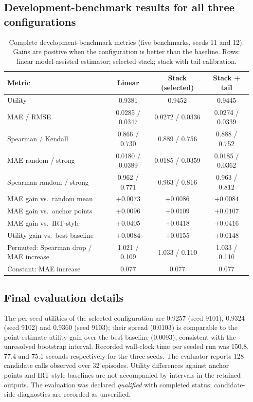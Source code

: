\documentclass{article}
\begin{document}
\subsection{Development-benchmark results for all three configurations}
\begin{table}[h]
\centering
\caption{Complete development-benchmark metrics (five benchmarks, seeds 11 and 12). Gains are positive when the configuration is better than the baseline. Rows: linear model-assisted estimator; selected stack; stack with tail calibration.}
\label{tab:search-full}
\footnotesize
\setlength{\tabcolsep}{3pt}
\begin{tabular}{lccc}
\toprule
Metric & Linear & Stack (selected) & Stack + tail \\
\midrule
Utility & 0.9381 & 0.9452 & 0.9445 \\ %
MAE / RMSE & 0.0285 / 0.0347 & 0.0272 / 0.0336 & 0.0274 / 0.0339 \\
Spearman / Kendall & 0.866 / 0.730 & 0.889 / 0.756 & 0.888 / 0.752 \\
MAE random / strong & 0.0180 / 0.0389 & 0.0185 / 0.0359 & 0.0185 / 0.0362 \\
Spearman random / strong & 0.962 / 0.771 & 0.963 / 0.816 & 0.963 / 0.812 \\
MAE gain vs.\ random mean & $+0.0073$ & $+0.0086$ & $+0.0084$ \\
MAE gain vs.\ anchor points & $+0.0096$ & $+0.0109$ & $+0.0107$ \\
MAE gain vs.\ IRT-style & $+0.0405$ & $+0.0418$ & $+0.0416$ \\
Utility gain vs.\ best baseline & $+0.0084$ & $+0.0155$ & $+0.0148$ \\
Permuted: Spearman drop / MAE increase & 1.021 / 0.109 & 1.033 / 0.110 & 1.033 / 0.110 \\
Constant: MAE increase & 0.077 & 0.077 & 0.077 \\
\bottomrule
\end{tabular}
\end{table}

\subsection{Final evaluation details}
The per-seed utilities of the selected configuration are 0.9257 (seed 9101), 0.9324 (seed 9102) and 0.9360 (seed 9103); their spread (0.0103) is comparable to the point-estimate utility gain over the best baseline (0.0093), consistent with the unresolved bootstrap interval. %
Recorded wall-clock time per seeded run was 150.8, 77.4 and 75.1 seconds respectively for the three seeds. The evaluator reports 128 candidate calls observed over 32 episodes. Utility differences against anchor points and IRT-style baselines are not accompanied by intervals in the retained outputs. The evaluation was declared \emph{qualified} with completed status; candidate-side diagnostics are recorded as unverified.
\end{document}
